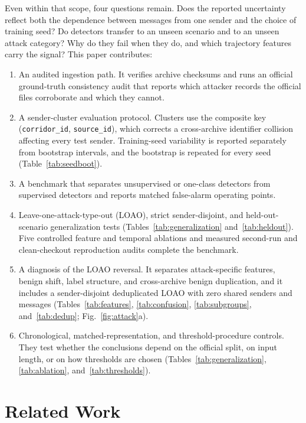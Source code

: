 \documentclass[preprint,12pt,numafflabel]{elsarticle}
\begin{document}
Even within that scope, four questions remain. Does the reported uncertainty reflect both the dependence between messages from one sender and the choice of training seed? Do detectors transfer to an unseen scenario and to an unseen attack category? Why do they fail when they do, and which trajectory features carry the signal? This paper contributes:
\begin{enumerate}
\item An audited ingestion path. It verifies archive checksums and runs an official ground-truth consistency audit that reports which attacker records the official files corroborate and which they cannot.
\item A sender-cluster evaluation protocol. Clusters use the composite key (\texttt{corridor\_id}, \texttt{source\_id}), which corrects a cross-archive identifier collision affecting every test sender. Training-seed variability is reported separately from bootstrap intervals, and the bootstrap is repeated for every seed (Table~\ref{tab:seedboot}).
\item A benchmark that separates unsupervised or one-class detectors from supervised detectors and reports matched false-alarm operating points.
\item Leave-one-attack-type-out (LOAO), strict sender-disjoint, and held-out-scenario generalization tests (Tables~\ref{tab:generalization} and~\ref{tab:heldout}). Five controlled feature and temporal ablations and measured second-run and clean-checkout reproduction audits complete the benchmark.
\item A diagnosis of the LOAO reversal. It separates attack-specific features, benign shift, label structure, and cross-archive benign duplication, and it includes a sender-disjoint deduplicated LOAO with zero shared senders and messages (Tables~\ref{tab:features}, \ref{tab:confusion}, \ref{tab:subgroups}, and~\ref{tab:dedup}; Fig.~\ref{fig:attack}a).
\item Chronological, matched-representation, and threshold-procedure controls. They test whether the conclusions depend on the official split, on input length, or on how thresholds are chosen (Tables~\ref{tab:generalization}, \ref{tab:ablation}, and~\ref{tab:thresholds}).
\end{enumerate}

\section{Related Work}
\end{document}
